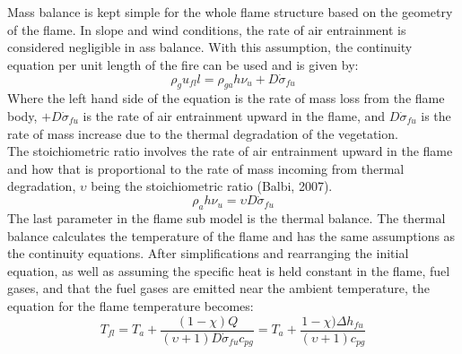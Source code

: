 \documentclass{article}
\begin{document}
\indent Mass balance is kept simple for the whole flame structure based on the geometry of the flame. In slope and wind conditions, the rate of air entrainment is considered negligible in ass balance. With this assumption, the continuity equation per unit length of the fire can be used and is given by:
\begin{equation}
	\label{mass balance balbi}
	\rho_g u_{fl}l = \rho_{ga} h \nu _u + D \dot{\sigma} _ {fu}
\end{equation}
Where the left hand side of the equation is the rate of mass loss from the flame body, $ + D \dot{\sigma} _ {fu}$ is the rate of air entrainment upward in the flame, and $D \dot{\sigma} _ {fu}$ is the rate of mass increase due to the thermal degradation of the vegetation. \\
\indent The stoichiometric ratio involves the rate of air entrainment upward in the flame and how that is proportional to the rate of mass incoming from thermal degradation, $\upsilon$ being the stoichiometric ratio (Balbi, 2007). 
\begin{equation}
	\label{stoich ratio}
	\rho _ a h \nu _ u = \upsilon D \dot{\sigma} _ {fu}
\end{equation}
\indent The last parameter in the flame sub model is the thermal balance. The thermal balance calculates the temperature of the flame and has the same assumptions as the continuity equations. After simplifications and rearranging the initial equation, as well as assuming the specific heat is held constant in the flame, fuel gases, and that the fuel gases are emitted near the ambient temperature, the equation for the flame temperature becomes:
\begin{equation}
	\label{flame temp balbi 2007}
	T_{fl} = T_a + \frac {(1 - \chi) Q}{(\upsilon + 1) D \dot{\sigma} _ {fu} c_{pg}} = T_a + \frac {1 - \chi) \Delta h _ {fu} }{(\upsilon + 1) c_{pg}}
\end{equation}
\end{document}
